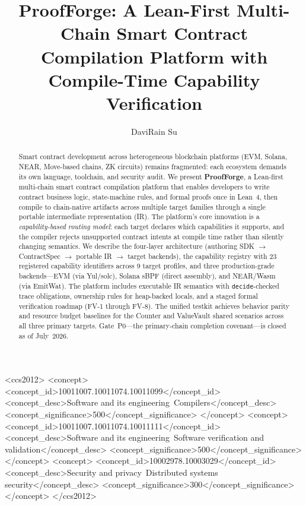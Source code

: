 \documentclass[sigconf]{acmart}
\begin{document}
\title{ProofForge: A Lean-First Multi-Chain Smart Contract\\Compilation Platform with Compile-Time Capability Verification}

\author{DaviRain Su}

\renewcommand{\shortauthors}{Su}

\begin{abstract}
Smart contract development across heterogeneous blockchain platforms (EVM, Solana, NEAR,
Move-based chains, ZK circuits) remains fragmented: each ecosystem demands its own language,
toolchain, and security audit. We present \textbf{ProofForge}, a Lean-first multi-chain smart
contract compilation platform that enables developers to write contract business logic,
state-machine rules, and formal proofs once in Lean~4, then compile to chain-native artifacts
across multiple target families through a single portable intermediate representation (IR).
The platform's core innovation is a \emph{capability-based routing model}: each target declares
which capabilities it supports, and the compiler rejects unsupported contract intents at
compile time rather than silently changing semantics. We describe the four-layer architecture
(authoring SDK $\to$ ContractSpec $\to$ portable IR $\to$ target backends), the capability
registry with 23 registered capability identifiers across 9 target profiles, and three
production-grade backends---EVM (via Yul/solc), Solana sBPF (direct assembly), and NEAR/Wasm
(via EmitWat). The platform includes executable IR semantics with \texttt{decide}-checked
trace obligations, ownership rules for heap-backed locals, and a staged formal verification
roadmap (FV-1 through FV-8). The unified testkit achieves behavior parity and resource budget
baselines for the Counter and ValueVault shared scenarios across all three primary targets.
Gate~P0---the primary-chain completion covenant---is closed as of July~2026.
\end{abstract}

\begin{CCSXML}
<ccs2012>
 <concept>
  <concept_id>10011007.10011074.10011099</concept_id>
  <concept_desc>Software and its engineering~Compilers</concept_desc>
  <concept_significance>500</concept_significance>
 </concept>
 <concept>
  <concept_id>10011007.10011074.10011111</concept_id>
  <concept_desc>Software and its engineering~Software verification and validation</concept_desc>
  <concept_significance>500</concept_significance>
 </concept>
 <concept>
  <concept_id>10002978.10003029</concept_id>
  <concept_desc>Security and privacy~Distributed systems security</concept_desc>
  <concept_significance>300</concept_significance>
 </concept>
</ccs2012>
\end{CCSXML}
\end{document}
